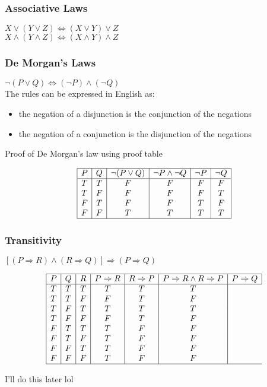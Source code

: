 \documentclass[11pt]{scrartcl}
\begin{document}
\subsubsection{Associative Laws}
$X \lor (Y \lor Z) \Leftrightarrow (X \lor Y) \lor Z $\\
$X \land (Y \land Z) \Leftrightarrow (X \land Y) \land Z $

\subsubsection{De Morgan's Laws}
$\lnot (P \lor Q) \Leftrightarrow (\lnot P) \land (\lnot Q)$
\\
The rules can be expressed in English as:
\begin{itemize}
	\item the negation of a disjunction is the conjunction of the negations
	\item the negation of a conjunction is the disjunction of the negations
\end{itemize}
Proof of De Morgan's law using proof table
\begin{center}
	\begin{displaymath}
		\begin{array}{|c|c|c|c|c|c|c|}
			\hline
			P & Q & \lnot (P \lor Q) & \lnot P \land \lnot Q & \lnot P & \lnot Q\\ 
			\hline
			T & T & F & F & F & F\\
			T & F & F & F & F & T\\
			F & T & F & F & T & F\\
			F & F & T & T & T & T\\
			\hline
		\end{array}
	\end{displaymath}
\end{center}

\subsubsection{Transitivity}
$[(P \Rightarrow R) \land (R \Rightarrow Q)] \Rightarrow (P \Rightarrow Q)$

\begin{center}
	\begin{displaymath}
		\begin{array}{|c|c|c|c|c|c|c|}
			\hline
			P & Q & R & P \Rightarrow R & R \Rightarrow P & P \Rightarrow R \land R \Rightarrow P & P \Rightarrow Q \\ 
			\hline
			T & T & T & T & T & T\\
			T & T & F & F & T & F\\
			T & F & T & T & T & T\\
			T & F & F & F & T & F\\
			F & T & T & T & F & F\\
			F & T & F & T & F & F\\
			F & F & T & T & F & F\\
			F & F & F & T & F & F\\
			\hline
		\end{array}
	\end{displaymath}
\end{center}
I'll do this later lol
\end{document}
